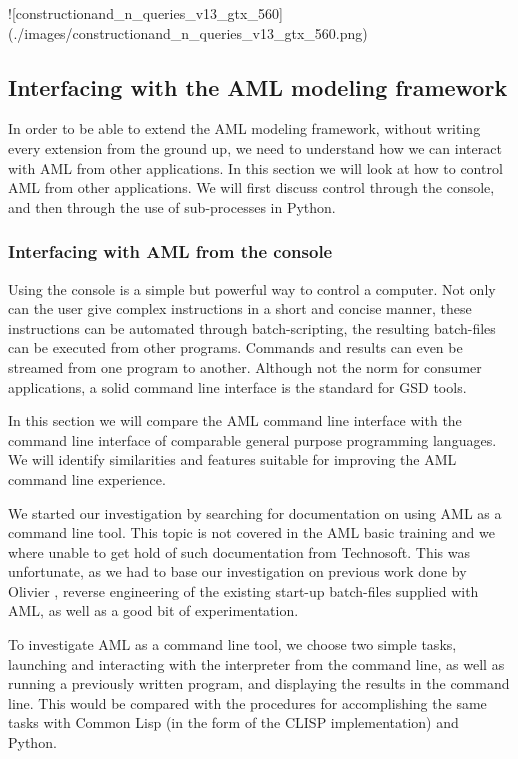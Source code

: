 ![constructionand_n_queries_v13_gtx_560](./images/constructionand_n_queries_v13_gtx_560.png)


\subsection{Interfacing with the AML modeling framework} %
\label{sub:interfacing_with_the_aml_modeling_framework}
In order to be able to extend the AML modeling framework, without writing every extension from the ground up, we need to understand how we can interact with AML from other applications. In this section we will look at how to control AML from other applications. We will first discuss control through the console, and then through the use of sub-processes in Python.

\subsubsection{Interfacing with AML from the console} %
\label{ssub:interfacing_with_aml_from_the_console}
Using the console is a simple but powerful way to control a computer. Not only can the user give complex instructions in a short and concise manner, these instructions can be automated through batch-scripting, the resulting batch-files can be executed from other programs. Commands and results can even be streamed from one program to another. Although not the norm for consumer applications, a solid command line interface is the standard for GSD tools.

In this section we will compare the AML command line interface with the command line interface of comparable general purpose programming languages. We will identify similarities and features suitable for improving the AML command line experience.

We started our investigation by searching for documentation on using AML as a command line tool. This topic is not covered in the AML basic training \citep{aml_ref} and we where unable to get hold of such documentation from Technosoft. This was unfortunate, as we had to base our investigation on previous work done by Olivier \citep{olivier}, reverse engineering of the existing start-up batch-files supplied with AML, as well as a good bit of experimentation.

To investigate AML as a command line tool, we choose two simple tasks, launching and interacting with the interpreter from the command line, as well as running a previously written program, and displaying the results in the command line. This would be compared with the procedures for accomplishing the same tasks with Common Lisp (in the form of the CLISP implementation) and Python.

